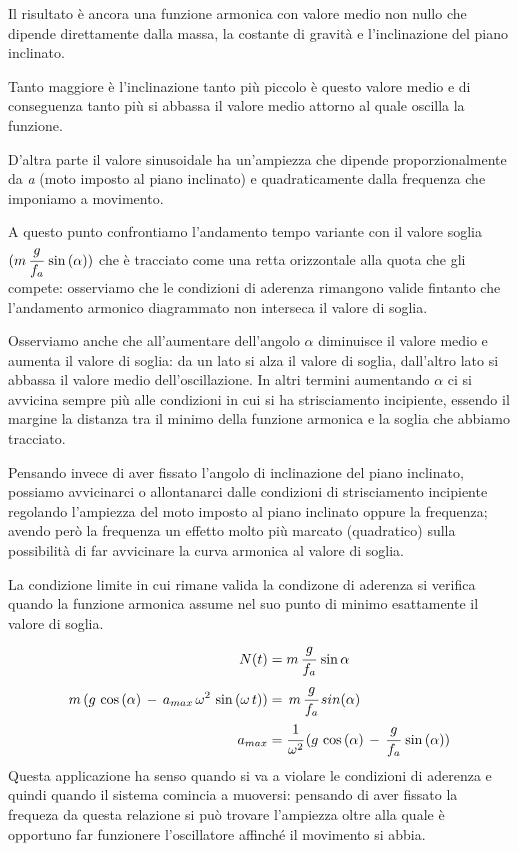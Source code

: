 Il risultato è ancora una funzione armonica con valore medio non nullo che dipende direttamente dalla massa, la costante di gravità e l'inclinazione del piano inclinato.

Tanto maggiore è l'inclinazione tanto più piccolo è questo valore medio e di conseguenza tanto più si abbassa il valore medio attorno al quale oscilla la funzione.

D'altra parte il valore sinusoidale ha un'ampiezza che dipende proporzionalmente da \emph{a} (moto imposto al piano inclinato) e quadraticamente dalla frequenza che imponiamo a movimento.

A questo punto confrontiamo l'andamento tempo variante con il valore soglia $(m\,\cfrac{g}{f_a}\,\sin{(\alpha)})$ che è tracciato come una retta orizzontale alla quota che gli compete: osserviamo che le condizioni di aderenza rimangono valide fintanto che l'andamento armonico diagrammato non interseca il valore di soglia.

Osserviamo anche che all'aumentare dell'angolo $\alpha$ diminuisce il valore medio e aumenta il valore di soglia: da un lato si alza il valore di soglia, dall'altro lato si abbassa il valore medio dell'oscillazione. In altri termini aumentando $\alpha$ ci si avvicina sempre più alle condizioni in cui si ha strisciamento incipiente, essendo il margine la distanza tra il minimo della funzione armonica e la soglia che abbiamo tracciato.

Pensando invece di aver fissato l'angolo di inclinazione del piano inclinato, possiamo avvicinarci o allontanarci dalle condizioni di strisciamento incipiente regolando l'ampiezza del moto imposto al piano inclinato oppure la frequenza; avendo però la frequenza un effetto molto più marcato (quadratico) sulla possibilità di far avvicinare la curva armonica al valore di soglia.

La condizione limite in cui rimane valida la condizone di aderenza si verifica quando la funzione armonica assume nel suo punto di minimo esattamente il valore di soglia.
\begin{align*}
N(t) &= m\,\cfrac{g}{f_a}\,\sin{\alpha}\\
 m\,(g\,\cos{(\alpha)}\,-\,a_{max}\,\omega^2\,\sin{(\omega\,t)})&=\,m\,\cfrac{g}{f_a}\,sin{(\alpha)}\\
 a_{max} &= \cfrac{1}{\omega^2}\,(g\,\cos{(\alpha)}\,-\,\cfrac{g}{f_a}\,\sin{(\alpha)})
\end{align*}
Questa applicazione ha senso quando si va a violare le condizioni di aderenza e quindi quando il sistema comincia a muoversi: pensando di aver fissato la frequeza da questa relazione si può trovare l'ampiezza oltre alla quale è opportuno far funzionere l'oscillatore affinché il movimento si abbia.

